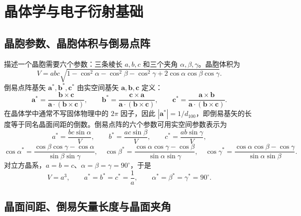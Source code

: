 \section{晶体学与电子衍射基础}

\subsection{晶胞参数、晶胞体积与倒易点阵}

描述一个晶胞需要六个参数：三条棱长 $a,b,c$ 和三个夹角 $\alpha,\beta,\gamma$。晶胞体积为
\begin{equation}
V=abc\sqrt{1-\cos^2\alpha-\cos^2\beta-\cos^2\gamma+2\cos\alpha\cos\beta\cos\gamma}.
\label{eq:volume}
\end{equation}
倒易点阵基矢 $\bm{a}^*,\bm{b}^*,\bm{c}^*$ 由实空间基矢 $\bm{a},\bm{b},\bm{c}$ 定义：
\begin{equation}
\bm{a}^*=\frac{\bm{b}\times\bm{c}}{\bm{a}\cdot(\bm{b}\times\bm{c})},\qquad
\bm{b}^*=\frac{\bm{c}\times\bm{a}}{\bm{a}\cdot(\bm{b}\times\bm{c})},\qquad
\bm{c}^*=\frac{\bm{a}\times\bm{b}}{\bm{a}\cdot(\bm{b}\times\bm{c})}.
\label{eq:reciprocal-vectors}
\end{equation}
在晶体学中通常不写固体物理中的 $2\pi$ 因子，因此 $|\bm{a}^*|=1/d_{100}$，即倒易基矢的长度等于同名晶面间距的倒数。倒易点阵的六个参数可用实空间参数表示为
\begin{equation}
a^*=\frac{bc\sin\alpha}{V},\qquad
b^*=\frac{ac\sin\beta}{V},\qquad
c^*=\frac{ab\sin\gamma}{V},
\label{eq:reciprocal-lengths}
\end{equation}
\begin{equation}
\cos\alpha^*=\frac{\cos\beta\cos\gamma-\cos\alpha}{\sin\beta\sin\gamma},\quad
\cos\beta^*=\frac{\cos\alpha\cos\gamma-\cos\beta}{\sin\alpha\sin\gamma},\quad
\cos\gamma^*=\frac{\cos\alpha\cos\beta-\cos\gamma}{\sin\alpha\sin\beta}.
\label{eq:reciprocal-angles}
\end{equation}
对立方晶系，$a=b=c$、$\alpha=\beta=\gamma=90^\circ$，于是
\begin{equation}
V=a^3,\qquad a^*=b^*=c^*=\frac{1}{a},\qquad \alpha^*=\beta^*=\gamma^*=90^\circ.
\label{eq:cubic-reciprocal}
\end{equation}

\subsection{晶面间距、倒易矢量长度与晶面夹角}

